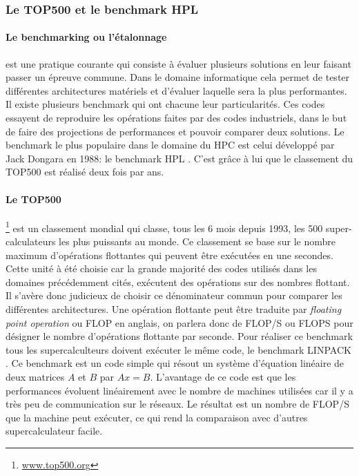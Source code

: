 

\subsubsection{Le TOP500 et le benchmark HPL}

\paragraph{Le benchmarking ou l'étalonnage} est une pratique courante qui consiste à évaluer plusieurs solutions en leur faisant passer un épreuve commune. Dans le domaine informatique cela permet de tester différentes architectures matériels et d'évaluer laquelle sera la plus performantes. Il existe plusieurs benchmark qui ont chacune leur particularités. Ces codes essayent de reproduire les opérations faites par des codes industriels, dans le but de faire des projections de performances et pouvoir comparer deux solutions. Le benchmark le plus populaire dans le domaine du HPC est celui développé par Jack Dongara en 1988: le benchmark HPL \cite{Dongarra}. C'est grâce à lui que le classement du TOP500 est réalisé deux fois par ans.


\paragraph{Le TOP500} \footnote{\url{www.top500.org}} est un classement mondial qui classe, tous les 6 mois depuis 1993, les 500 super-calculateurs les plus puissants au monde. Ce classement se base sur le nombre maximum d'opérations flottantes qui peuvent être exécutées en une secondes. Cette unité à été choisie car la grande majorité des codes utilisés dans les domaines précédemment cités, exécutent des opérations sur des nombres flottant. Il s'avère donc judicieux de choisir ce dénominateur commun pour comparer les différentes architectures.  Une opération flottante peut être traduite par \textit{floating point operation} ou FLOP en anglais, on parlera donc de FLOP/S ou FLOPS pour désigner le nombre d'opérations flottante par seconde. Pour réaliser ce benchmark tous les supercalculteurs doivent exécuter le même code, le benchmark LINPACK \cite{Dongarra} \cite{450b1baca0774fd0976ff739b90bed04}. Ce benchmark est un code simple qui résout un système d'équation linéaire de deux matrices $A$ et $B$ par $Ax = B$. L'avantage de ce code est que les performances évoluent linéairement avec le nombre de machines utilisées car il y a très peu de communication sur le réseaux. Le résultat est un nombre de FLOP/S que la machine peut exécuter, ce qui rend la comparaison avec d'autres supercalculateur facile. 



